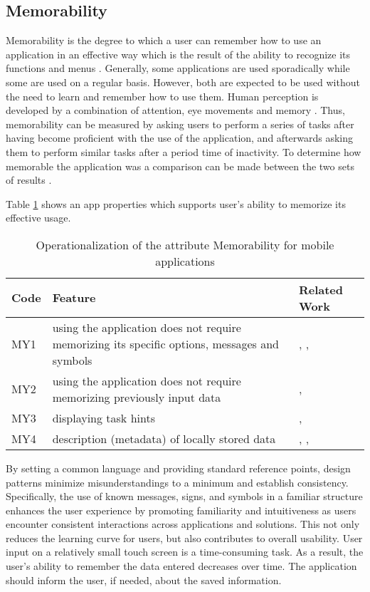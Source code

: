 \documentclass[preprint,12pt]{elsarticle}
\begin{document}
\subsection{Memorability}
Memorability is the degree to which a user can remember how to use an application in an effective way \cite{weichbroth2020usability} which is the result of the ability to recognize its functions and menus \cite{nurdina2021usability}.
Generally, some applications are used sporadically while some are used on a regular basis. However, both are expected to be used without the need to learn and remember how to use them. Human perception is developed by a combination of attention, eye movements and memory \cite{lahrache2018visualizations}. Thus, memorability can be measured by asking users to perform a series of tasks after having become proficient with the use of the application, and afterwards asking them to perform similar tasks after a period time of inactivity. To determine how memorable the application was a comparison can be made between the two sets of results \cite{harrison2013usability}. 

Table \ref{tab:oper-memo} shows an app properties which supports user's ability to memorize its effective usage.

\begin{table}[h]
\caption{Operationalization of the attribute Memorability for mobile applications}
\label{tab:oper-memo}
\footnotesize
\begin{tabular}{|l|p{9cm}|p{2.5cm}|}
\hline
\textbf{Code}  & \textbf{Feature}   & \textbf{Related Work} \\ \hline
MY1 & using the application does not require memorizing its specific options, messages and symbols & \cite{coursaris2011meta}, \cite{afif2021evaluating}, \cite{nizamani2021novel}      
\\ \hline
MY2 & using the application does not require memorizing previously input data &  \cite{abd2019evaluation}, \cite{hsu2014usability}      
\\ \hline
MY3 & displaying task hints &   \cite{hung2012enhancing}, \cite{bodrunova2018impact}     \\ \hline
MY4 & description (metadata) of locally stored data & \cite{nickerson2015managing}, \cite{nickerson2016selecting}, \cite{azadi2020mobile}  \\ \hline
\end{tabular}
\end{table}

By setting a common language and providing standard reference points, design patterns minimize 
misunderstandings to a minimum and establish consistency. Specifically, the use of known messages, signs, and symbols in a familiar structure enhances the user experience by promoting familiarity and intuitiveness as users encounter consistent interactions across applications and solutions. This not only reduces the learning curve for users, but also contributes to overall usability.
User input on a relatively small touch screen is a time-consuming task. As a result, the user's ability to remember the data entered decreases over time. The application should inform the user, if needed, about the saved information.
\end{document}
